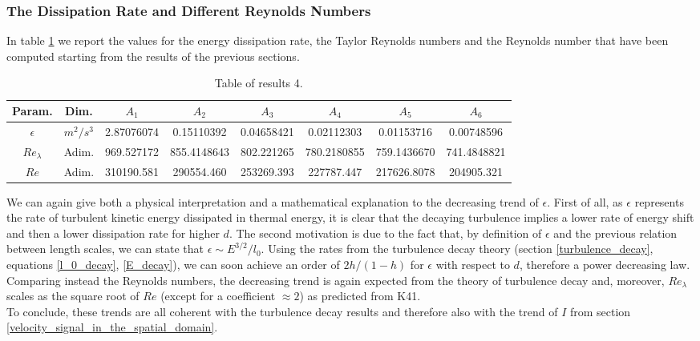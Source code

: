 \documentclass[11pt,titlepage]{article}
\begin{document}
\subsubsection{The Dissipation Rate and Different Reynolds Numbers}
In table \ref{tab4} we report the values for the energy dissipation rate, the Taylor Reynolds numbers and the Reynolds number that have been computed starting from the results of the previous sections. \\

\begin{table}[h!]
\centering
\caption{Table of results 4.} \label{tab4}
    \begin{tabular}{ | c | c | c | c | c | c | c | c |}
        \hline
        Param. & Dim. & $A_1$ & $A_2$ & $A_3$ & $A_4$ & $A_5$ & $A_6$ \\
        \hline
        $\epsilon$ & $m^2/s^3$&2.87076074& 0.15110392& 0.04658421& 0.02112303& 0.01153716 &0.00748596  \\
        \hline
        $Re_\lambda$ & Adim. & 969.527172 & 855.4148643& 802.221265 & 780.2180855& 759.1436670&
        741.4848821 \\
        \hline
        $Re$& Adim. &310190.581 & 290554.460& 253269.393 &227787.447&
        217626.8078 &204905.321 \\
        \hline
    \end{tabular}
\end{table}
We can again give both a physical interpretation and a mathematical explanation to the decreasing trend of $\epsilon$. First of all, as $\epsilon$ represents the rate of turbulent kinetic energy dissipated in thermal energy, it is clear that the decaying turbulence implies a lower rate of energy shift and then a lower dissipation rate for higher $d$. The second motivation is due to the fact that, by definition of $\epsilon$ and the previous relation between length scales, we can state that $\epsilon \sim E^{3/2}/l_0$. Using the rates from the turbulence decay theory (section \ref{turbulence_decay}, equations \ref{l_0_decay}, \ref{E_decay}), we can soon achieve an order of $2h/(1-h)$ for $\epsilon$ with respect to $d$, therefore a power decreasing law. \\
Comparing instead the Reynolds numbers, the decreasing trend is again expected from the theory of turbulence decay and, moreover, $Re_{\lambda}$ scales as the square root of $Re$ (except for a coefficient $\approx 2$) as predicted from K41. \\
To conclude, these trends are all coherent with the turbulence decay results and therefore also with the trend of $I$ from section \ref{velocity_signal_in_the_spatial_domain}.
\end{document}
